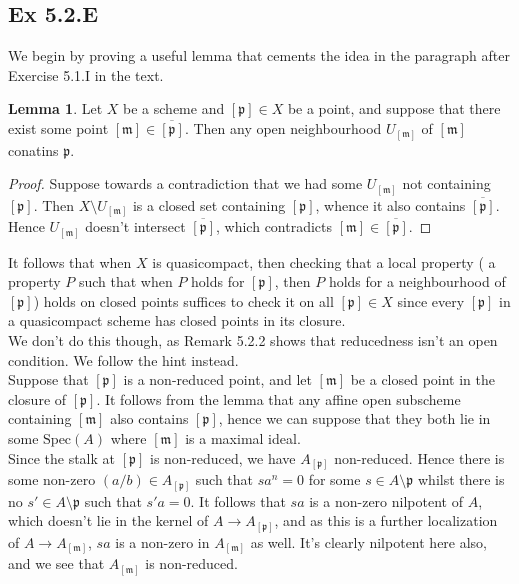 \documentclass{article}
\theoremstyle{definition}
\newtheorem{lemma}[theorem]{Lemma}
\newcommand{\Spec}{\text{Spec}}
\begin{document}
\subsection*{Ex 5.2.E}

We begin by proving a useful lemma that cements the idea in the paragraph after
Exercise 5.1.I in the text.

\begin{lemma}
	Let $X$ be a scheme and $[\mathfrak{p}] \in X$ be a point, and suppose that
	there exist some point $[\mathfrak{m}] \in \overline{[\mathfrak{p}]}$. Then
	any open neighbourhood $U_{[\mathfrak{m}]}$ of $[\mathfrak{m}]$ conatins
	$\mathfrak{p}$. 
\end{lemma}
\begin{proof}
	Suppose towards a contradiction that we had some $U_{[\mathfrak{m}]}$ not
	containing $[\mathfrak{p}]$. Then $X \setminus U_{[\mathfrak{m}]}$ is a
	closed set containing $[\mathfrak{p}]$, whence it also contains
	$\overline{[\mathfrak{p}]}$. Hence $U_{[\mathfrak{m}]}$ doesn't intersect
	$\overline{[\mathfrak{p}]}$, which contradicts $[\mathfrak{m}] \in
	\overline{[\mathfrak{p}]}$.
\end{proof}

It follows that when $X$ is quasicompact, then checking that a local property (
a property $P$ such that when $P$ holds for $[\mathfrak{p}]$, then $P$ holds
for a neighbourhood of $[\mathfrak{p}]$) holds on closed points suffices to
check it on all $[\mathfrak{p}] \in X$ since every $[\mathfrak{p}]$ in a
quasicompact scheme has closed points in its closure. \\

We don't do this though, as Remark 5.2.2 shows that reducedness isn't an open
condition. We follow the hint instead. \\

Suppose that $[\mathfrak{p}]$ is a non-reduced point, and let $[\mathfrak{m}]$
be a closed point in the closure of $[\mathfrak{p}]$. It follows from the lemma
that any affine open subscheme containing $[\mathfrak{m}]$ also contains
$[\mathfrak{p}]$, hence we can suppose that they both lie in some $\Spec(A)$
where $[\mathfrak{m}]$ is a maximal ideal. \\

Since the stalk at $[\mathfrak{p}]$ is non-reduced, we have
$A_{[\mathfrak{p}]}$ non-reduced. Hence there is some non-zero $(a/b) \in
A_{[\mathfrak{p}]}$ such that $sa^n = 0$ for some $s \in A \setminus
\mathfrak{p}$ whilst there is no $s' \in A \setminus \mathfrak{p}$ such that
$s'a = 0$. It follows that $sa$ is a non-zero nilpotent of $A$, which doesn't
lie in the kernel of $A \to A_{[\mathfrak{p}]}$, and as this is a further
localization of $A \to A_{[\mathfrak{m}]}$, $sa$ is a non-zero in
$A_{[\mathfrak{m}]}$ as well. It's clearly nilpotent here also, and
we see that $A_{[\mathfrak{m}]}$ is non-reduced.
\end{document}
